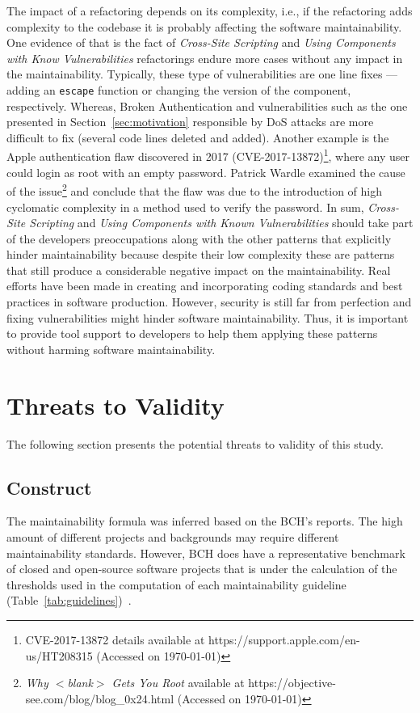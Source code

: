 \documentclass[10pt,conference]{IEEEtran}
\begin{document}
{The impact of a refactoring depends on its complexity, i.e., if the refactoring
adds complexity to the codebase it is probably affecting the software
maintainability. One evidence of that is the fact of \emph{Cross-Site
Scripting} and \emph{Using Components with Know Vulnerabilities} refactorings
endure more cases without any impact in the maintainability. Typically, these
type of vulnerabilities are one line fixes --- adding an \texttt{escape}
function or changing the version of the component, respectively. Whereas,
Broken Authentication and vulnerabilities such as the one presented in
Section~\ref{sec:motivation} responsible by DoS attacks are more difficult to
fix (several code lines deleted and added). Another example is the Apple
authentication flaw discovered in 2017 (CVE-2017-13872)\footnote{CVE-2017-13872
details available at https://support.apple.com/en-us/HT208315 (Accessed on
\today{})}, where any user could login as root with an empty password. Patrick
Wardle examined the cause of the issue\footnote{\emph{Why $<$blank$>$ Gets You
Root} available at https://objective-see.com/blog/blog\_0x24.html (Accessed on
\today{})} and conclude that the flaw was due to the introduction of high
cyclomatic complexity in a method used to verify the password. In sum,
\emph{Cross-Site Scripting} and \emph{Using Components with Known
Vulnerabilities} should take part of the developers preoccupations along with
the other patterns that explicitly hinder maintainability because despite their
low complexity these are patterns that still produce a considerable negative
impact on the maintainability. Real efforts have been made in creating and
incorporating coding standards and best practices in software production.
However, security is still far from perfection and fixing vulnerabilities might
hinder software maintainability. Thus, it is important to provide tool support
to developers to help them applying these patterns without harming software
maintainability.

\section{Threats to Validity}\label{sec:threats}
%
The following section presents the potential threats to validity of this study.
%
\subsection{Construct}
%

The maintainability formula was inferred based on the BCH's reports.
The high amount of different projects and backgrounds may require different maintainability
standards. However, BCH does have a representative benchmark of closed and open-source
software projects that is under the calculation of the thresholds used in the computation
of each maintainability guideline (Table~\ref{tab:guidelines})~\cite{Visser:2016:OREILLY,
Baggen2012}.

}
\end{document}
